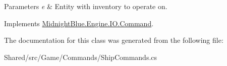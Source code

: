 \begin{DoxyParams}{Parameters}
{\em e} & Entity with inventory to operate on.\\
\hline
\end{DoxyParams}


Implements \hyperlink{class_midnight_blue_1_1_engine_1_1_i_o_1_1_command_ae641d2c1a9db17f03ee6b7854b00a9d2}{Midnight\+Blue.\+Engine.\+I\+O.\+Command}.



The documentation for this class was generated from the following file\+:\begin{DoxyCompactItemize}
\item 
Shared/src/\+Game/\+Commands/Ship\+Commands.\+cs\end{DoxyCompactItemize}
